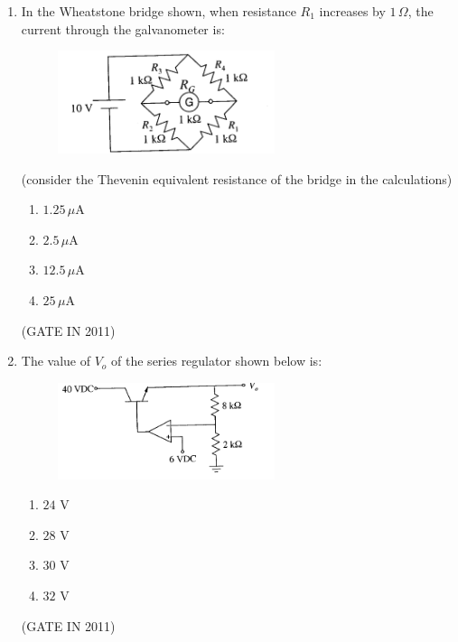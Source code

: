 \documentclass[journal]{IEEEtran}
\begin{document}
\begin{enumerate}
\item In the Wheatstone bridge shown, when resistance $R_1$ increases by $1\,\Omega$, the current through the galvanometer is:
\begin{figure}[H]
    \centering
      \includegraphics[width=0.6\textwidth]{13.png} 
      \caption{}
    \label{fig:fig13} 
\end{figure}
(consider the Thevenin equivalent resistance of the bridge in the calculations)
\begin{multicols}{4}
\begin{enumerate}
\item $1.25\,\mu$A  
\item $2.5\,\mu$A  
\item $12.5\,\mu$A  
\item $25\,\mu$A
\end{enumerate}
\end{multicols} \hfill(GATE IN 2011)


\item The value of $V_o$ of the series regulator shown below is:
\begin{figure}[H]
    \centering
      \includegraphics[width=0.6\textwidth]{14.png} 
      \caption{}
    \label{fig:fig14} 
\end{figure}
\begin{multicols}{4}
\begin{enumerate}
\item $24$ V  
\item $28$ V  
\item $30$ V  
\item $32$ V
\end{enumerate}
\end{multicols} \hfill(GATE IN 2011)


\end{enumerate}
\end{document}
